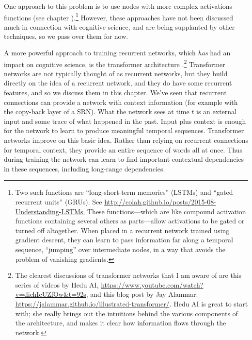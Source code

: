 One approach to this problem is to use nodes with more complex activations functions (see chapter ).\footnote{Two such functions are ``long-short-term memories'' (LSTMs)  \cite{schmidhuber1997long, olah2015understanding} and ``gated recurrent units'' (GRUs). See \url{http://colah.github.io/posts/2015-08-Understanding-LSTMs.} These functions---which are like compound activation functions containing several others as parts---allow activations to be gated or turned off altogether. When placed in a recurrent network trained using gradient descent, they can learn to pass information far along a temporal sequence, ``jumping'' over intermediate nodes, in a way that avoids the problem of vanishing gradients.\label{lstm}} However, these approaches have not been discussed much in connection with cognitive science, and are being supplanted by other techniques, so we pass over them for now.

A more powerful approach to training recurrent networks, which \emph{has} had an impact on cognitive science,  is the transformer architecture \cite{vaswani2017attention}.\footnote{The clearest discussions of transformer networks that I am aware of are this series of videos by Hedu AI, \url{https://www.youtube.com/watch?v=dichIcUZfOw&t=92s}, and this blog post by Jay Alammar: \url{https://jalammar.github.io/illustrated-transformer/}. Hedu AI is great to start with; she really brings out the intuitions behind the various components of the architecture, and makes it clear how information flows through the network.} Transformer networks are not typically thought of as recurrent networks, but they build directly on the idea of a recurrent network, and they do have some recurrent features, and so we discuss them in this chapter. We've seen that recurrent connections can provide a network with context information (for example with the copy-back layer of a SRN). What the network sees at time $t$ is an external input and some trace of what happened in the past.  Input plus context is enough for the network to learn to produce meaningful temporal sequences. Transformer networks improve on this basic idea. Rather than relying on recurrent connections for temporal context, they provide an entire sequence of words all at once. Thus during training the network can learn to find important contextual dependencies in these sequences, including long-range dependencies.

